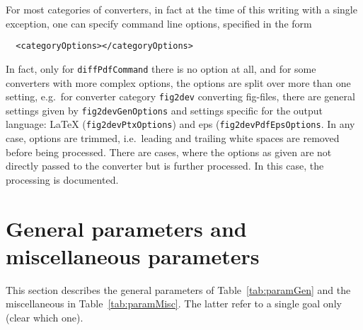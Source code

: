 For most categories of converters, in fact at the time of this writing with a single exception, 
one can specify command line options, specified in the form 
%
\begin{verbatim}
  <categoryOptions></categoryOptions>
\end{verbatim}
%
In fact, only for \texttt{diffPdfCommand} there is no option at all, 
and for some converters with more complex options, the options are split over more than one setting, 
e.g.~for converter category \texttt{fig2dev} converting \gls{fig}-files, 
there are general settings given by \texttt{fig2devGenOptions}
and settings specific for the output language: 
\LaTeX{} (\texttt{fig2devPtxOptions}) and \gls{eps} (\texttt{fig2devPdfEpsOptions}. 
In any case, options are trimmed, i.e.~leading and trailing white spaces are removed 
before being processed. 
There are cases, where the options as given are not directly passed to the converter 
but is further processed. 
In this case, the processing is documented. 





\section{General parameters and miscellaneous parameters }\label{sec:settingsGenMisc}

This section describes the general parameters of Table~\ref{tab:paramGen} 
and the miscellaneous in Table~\ref{tab:paramMisc}. 
The latter refer to a single goal only (clear which one). 


